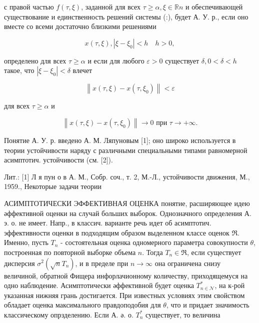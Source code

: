 \documentclass[10pt]{article}
\begin{document}
с правой частью $f(\tau, \xi)$, заданной для всех $\tau \geqslant \alpha, \xi \in \mathbb{R} n$ и обеспечивающей существование и единственность решений системы (:), будет А. У. р., если оно вместе со всеми достаточно близкими решениями



\[

x(\tau, \xi),\left|\xi-\xi_{0}\right|<h \quad h>0,

\]



определено для всех $\tau \geqslant \alpha$ и если для любого $\varepsilon>0$ существует $\delta, 0<\delta<h$ такое, что $\left|\xi-\xi_{0}\right|<\delta$ влечет



\[

\left\|x(\tau, \xi)-x\left(\tau, \xi_{0}\right)\right\|<\varepsilon

\]



для всех $\tau \geqslant \alpha$ и



\[

\left\|x(\tau, \xi)-x\left(\tau, \xi_{0}\right)\right\| \longrightarrow 0 \text { при } \tau \longrightarrow+\infty .

\]



Понятие А. У. р. введено А. М. Ляпуновым [1]; оно широко используется в теории устойчивости наряду с различными специальными типами равномерной асимптотич. устойчивости (см. [2]).



Лит.: [1] Л я пун о в А. М., Собр. соч., т. 2, М.-Л., устойчивости движения, М., 1959., Некоторые задачи теории



АСИМПТОТИЧЕСКИ ЭФФЕКТИВНАЯ ОЦЕНКА понятие, расширяющее идею әффективной оценки на случай больших выборок. Однозначного определения А. э. о. не имеет. Напр., в классич. варианте речь идет об асимптотич. эффективности оценки в подходящим образом выделенном классе оценок $\mathfrak{\Re}$. Именно, пусть $T_{n}$ - состоятельная оценка одномерного параметра совокупности $\theta$, построенная по повторной выборке объема $n$. Тогда $T_{n} \in \Re$, если существует дисперсия $\sigma^{2}\left(\sqrt{n} T_{n}\right)$, и в пределе при $n \rightarrow \infty$ она ограничена снизу величиной, обратной Фищера инфорлачионному количеству, приходящемуся на одно наблюдение. Асимптотически әффективной будет оценка $T_{n \in \mathscr{N}}^{*}$, на к-рой указанная нижняя грань достигается. При известных условиях этим свойством обладает оценка максимального правдоподобия для $\theta$, что и придает значимость классическому опрзделению. Если А. ә. о. $T_{n}^{*}$ существует, то величина
\end{document}
